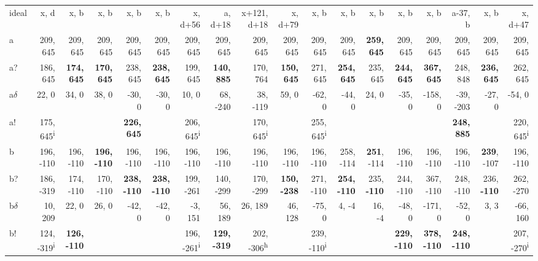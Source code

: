 \begin{table}[p]
{\begin{tabular}{lrrrrrrrrrrrrrrrrr}
ideal & x, d & x, b & x, b & x, b & x, b & x, d+56 & a, d+18 & x+121, d+18 & x, d+79 & x, b & x, b & x, b & x, b & x, b & a-37, b & x, b & x, d+47 \\
a & 209, 645 & 209, 645 & 209, 645 & 209, 645 & 209, 645 & 209, 645 & 209, 645 & 209, 645 & 209, 645 & 209, 645 & 209, 645 & \textbf{259, 645} & 209, 645 & 209, 645 & 209, 645 & 209, 645 & 209, 645 \\
a? & 186, 645 & \textbf{174, 645} & \textbf{170, 645} & 238, 645 & \textbf{238, 645} & 199, 645 & \textbf{140, 885} & 170, 764 & \textbf{150, 645} & 271, 645 & \textbf{254, 645} & 235, 645 & \textbf{244, 645} & \textbf{367, 645} & 248, 848 & \textbf{236, 645} & 262, 645 \\
a$\delta$ & 22, 0 & 34, 0 & 38, 0 & -30, 0 & -30, 0 & 10, 0 & 68, -240 & 38, -119 & 59, 0 & -62, 0 & -44, 0 & 24, 0 & -35, 0 & -158, 0 & -39, -203 & -27, 0 & -54, 0 \\
a! & 175, 645\textsuperscript{i} &  &  & \textbf{226, 645} &  & 206, 645\textsuperscript{i} &  & 170, 645\textsuperscript{i} &  & 255, 645\textsuperscript{i} &  &  &  &  & \textbf{248, 885} &  & 220, 645\textsuperscript{i} \\
b & 196, -110 & 196, -110 & \textbf{196, -110} & 196, -110 & 196, -110 & 196, -110 & 196, -110 & 196, -110 & 196, -110 & 196, -110 & 258, -114 & \textbf{251}, -114 & 196, -110 & 196, -110 & 196, -110 & \textbf{239}, -107 & 196, -110 \\
b? & 186, -319 & 174, -110 & 170, -110 & \textbf{238, -110} & \textbf{238, -110} & 199, -261 & 140, -299 & 170, -299 & \textbf{150, -238} & 271, -110 & \textbf{254, -110} & 235, \textbf{-110} & 244, -110 & 367, -110 & 248, -110 & 236, \textbf{-110} & 262, -270 \\
b$\delta$ & 10, 209 & 22, 0 & 26, 0 & -42, 0 & -42, 0 & -3, 151 & 56, 189 & 26, 189 & 46, 128 & -75, 0 & 4, -4 & 16, -4 & -48, 0 & -171, 0 & -52, 0 & 3, 3 & -66, 160 \\
b! & 124, -319\textsuperscript{i} & \textbf{126, -110} &  &  &  & 196, -261\textsuperscript{i} & \textbf{129, -319} & 202, -306\textsuperscript{h} &  & 239, -110\textsuperscript{i} &  &  & \textbf{229, -110} & \textbf{378, -110} & \textbf{248, -110} &  & 207, -270\textsuperscript{i} \\

\end{tabular}}
\end{table}
